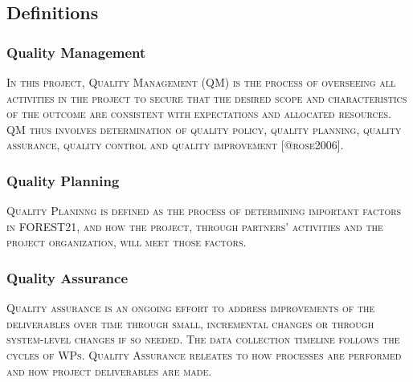 \documentclass[
  11pt,
]{article}
\begin{document}
\hypertarget{definitions}{%
\subsection{Definitions}\label{definitions}}

\hypertarget{quality-management}{%
\subsubsection{Quality Management}\label{quality-management}}

\begin{tcolorbox}

\textsc{In this project, Quality Management (QM) is the process of overseeing all activities in the project to secure that the desired scope and characteristics of the outcome are consistent with expectations and allocated resources. QM thus involves determination of quality policy, quality planning, quality assurance, quality control and quality improvement [@rose2006].}

\end{tcolorbox}

\hypertarget{quality-planning}{%
\subsubsection{Quality Planning}\label{quality-planning}}

\begin{tcolorbox}

\textsc{Quality Planinng is defined as the process of determining important factors in FOREST21, and how the project, through partners' activities and the project organization, will meet those factors.}

\end{tcolorbox}

\hypertarget{quality-assurance}{%
\subsubsection{Quality Assurance}\label{quality-assurance}}

\begin{tcolorbox}

\textsc{Quality assurance is an ongoing effort to address improvements of the deliverables over time through small, incremental changes or through system-level changes if so needed. The data collection timeline follows the cycles of WPs. Quality Assurance releates to how processes are performed and how project deliverables are made.}

\end{tcolorbox}
\end{document}
